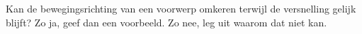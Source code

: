 
\begin{exercise}



 Kan de bewegingsrichting van een voorwerp omkeren terwijl de versnelling gelijk blijft? Zo ja, geef dan een voorbeeld. Zo nee, leg uit waarom dat niet kan.

\end{exercise}

